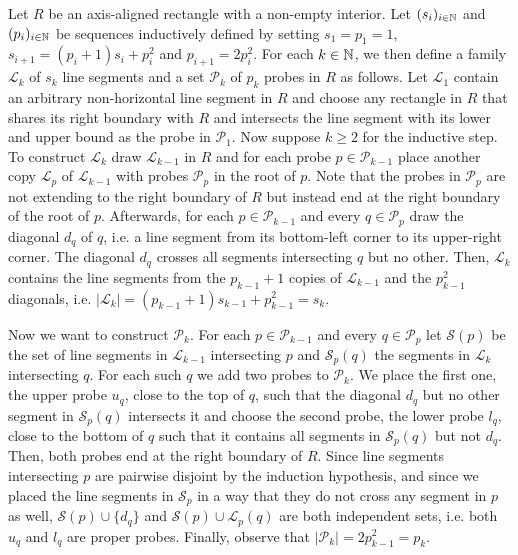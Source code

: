 Let $R$ be an axis-aligned rectangle with a non-empty interior. Let $(s_i)_{i\in\mathbb{N}}$ and $(p_i)_{i\in\mathbb{N}}$ be sequences inductively defined by setting $s_1=p_1=1$, $s_{i+1}=(p_i+1)s_i+p_i^2$ and $p_{i+1}=2p_i^2$. For each $k\in\mathbb{N}$, we then define a family $\mathcal{L}_k$ of $s_k$ line segments and a set $\mathcal{P}_k$ of $p_k$ probes in $R$ as follows. Let $\mathcal{L}_1$ contain an arbitrary non-horizontal line segment in $R$ and choose any rectangle in $R$ that shares its right boundary with $R$ and intersects the line segment with its lower and upper bound as the probe in $\mathcal{P}_1$. Now suppose $k\geq 2$ for the inductive step. To construct $\mathcal{L}_k$ draw $\mathcal{L}_{k-1}$ in $R$ and for each probe $p\in\mathcal{P}_{k-1}$ place another copy $\mathcal{L}_p$ of $\mathcal{L}_{k-1}$ with probes $\mathcal{P}_{p}$ in the root of $p$. Note that the probes in $\mathcal{P}_{p}$ are not extending to the right boundary of $R$ but instead end at the right boundary of the root of $p$. Afterwards, for each $p\in\mathcal{P}_{k-1}$ and every $q\in\mathcal{P}_{p}$ draw the diagonal $d_q$ of $q$, i.e. a line segment from its bottom-left corner to its upper-right corner. The diagonal $d_q$ crosses all segments intersecting $q$ but no other. Then, $\mathcal{L}_k$ contains the line segments from the $p_{k-1} + 1$ copies of $\mathcal{L}_{k-1}$ and the $p_{k-1}^2$ diagonals, i.e. $\vert \mathcal{L}_k\vert =(p_{k-1} + 1)s_{k-1}+p_{k-1}^2=s_k$. 

Now we want to construct $\mathcal{P}_k$. For each $p\in\mathcal{P}_{k-1}$ and every $q\in\mathcal{P}_{p}$ let $\mathcal{S}(p)$ be the set of line segments in $\mathcal{L}_{k-1}$ intersecting $p$ and $\mathcal{S}_p(q)$ the segments in $\mathcal{L}_k$ intersecting $q$. For each such $q$ we add two probes to $\mathcal{P}_k$. We place the first one, the upper probe $u_q$, close to the top of $q$, such that the diagonal $d_q$ but no other segment in $\mathcal{S}_p(q)$ intersects it and choose the second probe, the lower probe $l_q$, close to the bottom of $q$ such that it contains all segments in $\mathcal{S}_p(q)$ but not $d_q$. Then, both probes end at the right boundary of $R$. Since line segments intersecting $p$ are pairwise disjoint by the induction hypothesis, and since we placed the line segments in $\mathcal{S}_p$ in a way that they do not cross any segment in $p$ as well, $\mathcal{S}(p)\cup \lbrace d_q\rbrace$ and $\mathcal{S}(p)\cup\mathcal{L}_p(q)$ are both independent sets, i.e. both $u_q$ and $l_q$ are proper probes. Finally, observe that $\vert \mathcal{P}_k\vert = 2p_{k-1}^2=p_k$.

